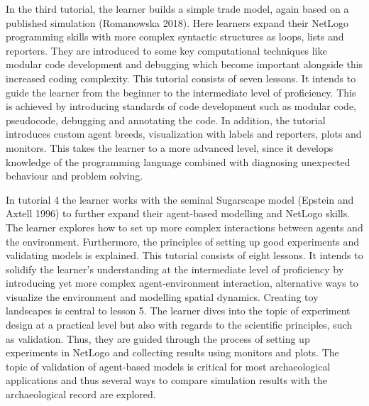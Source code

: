 \documentclass[
]{article}
\begin{document}
In the third tutorial, the learner builds a simple trade model, again based on a published simulation (Romanowska 2018). Here learners expand their NetLogo programming skills with more complex syntactic structures as loops, lists and reporters. They are introduced to some key computational techniques like modular code development and debugging which become important alongside this increased coding complexity. This tutorial consists of seven lessons. It intends to guide the learner from the beginner to the intermediate level of proficiency. This is achieved by introducing standards of code development such as modular code, pseudocode, debugging and annotating the code. In addition, the tutorial introduces custom agent breeds, visualization with labels and reporters, plots and monitors. This takes the learner to a more advanced level, since it develops knowledge of the programming language combined with diagnosing unexpected behaviour and problem solving.

In tutorial 4 the learner works with the seminal Sugarscape model (Epstein and Axtell 1996) to further expand their agent-based modelling and NetLogo skills. The learner explores how to set up more complex interactions between agents and the environment. Furthermore, the principles of setting up good experiments and validating models is explained. This tutorial consists of eight lessons. It intends to solidify the learner's understanding at the intermediate level of proficiency by introducing yet more complex agent-environment interaction, alternative ways to visualize the environment and modelling spatial dynamics. Creating toy landscapes is central to lesson 5. The learner dives into the topic of experiment design at a practical level but also with regards to the scientific principles, such as validation. Thus, they are guided through the process of setting up experiments in NetLogo and collecting results using monitors and plots. The topic of validation of agent-based models is critical for most archaeological applications and thus several ways to compare simulation results with the archaeological record are explored.
\end{document}
